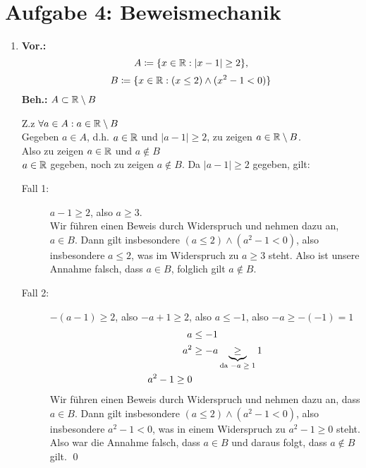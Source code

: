 \documentclass{gadsescript}
\begin{document}
\maketitle

\section*{Aufgabe 4: Beweismechanik}
\begin{enumerate}[label=\alph*)]
	\item \textbf{Vor.:}
		\[ A \coloneqq \{x \in \mathbb{R} : | x - 1 | \geq 2 \}, \]
		\[ B \coloneqq \{x \in \mathbb{R} : (x \leq 2) \wedge ( x^2 - 1 < 0) \} \]
		\textbf{Beh.:} $ A \subset \mathbb{R} \setminus B $
		\begin{proof*}
			Z.z $ \forall a \in A : a \in \mathbb{R} \setminus B $\\
			Gegeben $ a \in A $, d.h. $ a \in \mathbb{R} $ und $ | a - 1 | \geq 2 $, zu zeigen $ a \in \mathbb{R} \setminus B $.\\
			Also zu zeigen $ a \in \mathbb{R} $ und $ a \notin B $\\
			$ a \in \mathbb{R} $ gegeben, noch zu zeigen $ a \notin B $.
			Da $ | a - 1 | \geq 2 $ gegeben, gilt:\\
			\begin{description}
				\item[Fall 1:] $ a - 1 \geq 2 $, also $ a \geq 3 $.\\
					Wir führen einen Beweis durch Widerspruch und nehmen dazu an, $ a \in B $. Dann gilt insbesondere $ ( a \leq 2 ) \wedge ( a^2 - 1 < 0 ) $, also insbesondere $ a \leq 2 $, was im Widerspruch zu $ a \geq 3 $ steht. Also ist unsere Annahme falsch, dass $ a \in B $, folglich gilt $ a \notin B $.
				\item[Fall 2:] $ - ( a - 1 ) \geq 2 $, also $ -a  +1 \geq 2 $, also $ a \leq -1 $, also $ -a \geq -(-1) = 1 $\\
					\begin{align*}
						a &\leq -1\\
						a^2 &\geq -a \underbrace{\geq}_{\text{da $ -a \geq 1 $}} 1\\
						a^2 - 1 \geq 0
					\end{align*}
					Wir führen einen Beweis durch Widerspruch und nehmen dazu an, dass $ a \in B $. Dann gilt insbesondere $ ( a \leq 2 ) \wedge ( a^2 - 1 < 0 ) $, also insbesondere $ a^2 - 1 < 0 $, was in einem Widerspruch zu $ a^2 - 1 \geq 0 $ steht. Also war die Annahme falsch, dass $ a \in B $ und daraus folgt, dass $ a \notin B $ gilt. \qed
			\end{description}

\end{proof*}
\end{enumerate}
\end{document}
